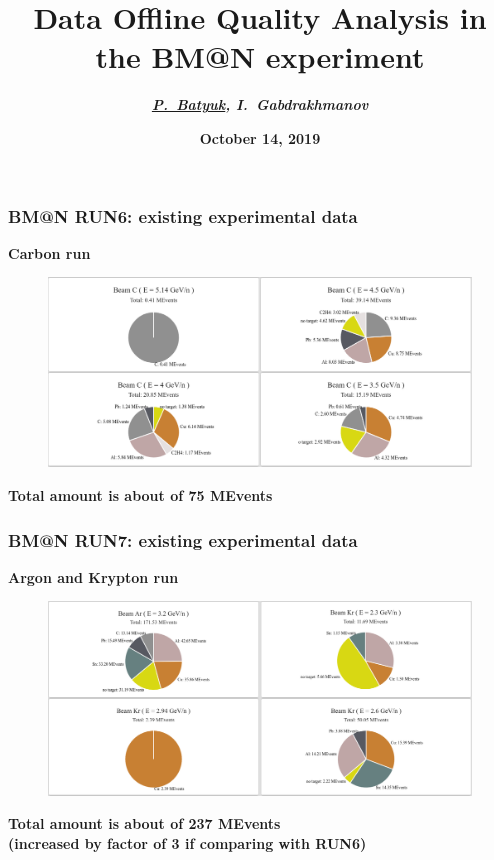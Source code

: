 \documentclass[dvipsnames] {beamer}
\title[\bf 4th Collaboration Meeting of the BM@N Experiment at the NICA Facility ]{\textbf{\large {Data Offline Quality Analysis in the BM@N experiment}}}
\author[\bf P.~Batyuk]{\textit{\textbf{{\footnotesize \underline{P.~Batyuk}, I.~Gabdrakhmanov}}}}
\institute{\bf Software \& analysis meeting }
\date{{\textbf{October 14, 2019}}}
\begin{document}
\maketitle

\begin{frame}
  \frametitle{\bf \centering BM@N RUN6: existing experimental data}
  \begin{block}{\bf \centering Carbon run}
     \begin{figure}[H]
       \includegraphics[width=1.\linewidth]{Run6_stat.png}
     \end{figure}
  \end{block}
  \begin{block}{}
    \bf \centering Total amount is about of 75 MEvents 
  \end{block}
\end{frame}

\begin{frame}
  \frametitle{\bf \centering BM@N RUN7: existing experimental data}
  \begin{block}{\bf \centering Argon and Krypton run}
     \begin{figure}[H]
       \includegraphics[width=1.\linewidth]{Run7_stat.png}
     \end{figure}
  \end{block}
  \begin{block}{}
    \bf \centering Total amount is about of 237 MEvents \\ (increased by factor of 3 if comparing with RUN6)
  \end{block}
\end{frame}
\end{document}
